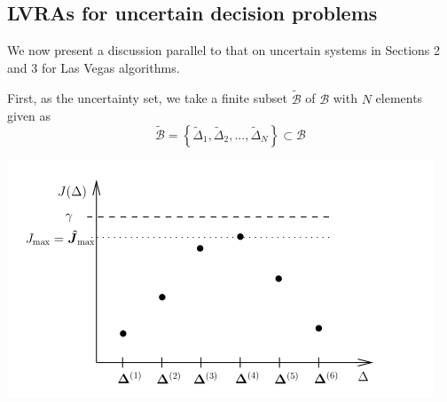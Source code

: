 \documentclass[12pt]{article}
\begin{document}
		\subsection{LVRAs for uncertain decision problems}
			We now present a discussion parallel to that on uncertain systems in Sections 2 and 3 for Las Vegas algorithms.
			\par
			First, as the uncertainty set, we take a finite subset $\tilde{\mathscr{B}}$ of $\mathscr{B}$ with $N$ elements given as
			\begin{equation*}
				\tilde{\mathscr{B}} = \left\{\tilde{\Delta}_1, \tilde{\Delta}_2, ..., \tilde{\Delta}_N\right\} \subset \mathscr{B}
			\end{equation*}

			\begin{center}
				\includegraphics[width=0.49\linewidth]{2.png}
			\end{center}
			
 
			
\end{document}
